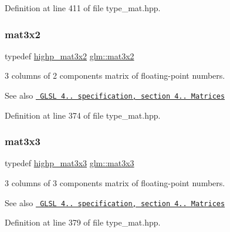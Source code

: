 Definition at line 411 of file type\+\_\+mat.\+hpp.

\mbox{\label{group__core__types_gad7476e0e866186f12ee87975c6b01552}} 
\subsubsection{\texorpdfstring{mat3x2}{mat3x2}}
{\footnotesize\ttfamily typedef \mbox{\hyperlink{group__core__precision_ga5df0f5c4120d0fd47825506c86b7814c}{highp\+\_\+mat3x2}} \mbox{\hyperlink{group__core__types_gad7476e0e866186f12ee87975c6b01552}{glm\+::mat3x2}}}

3 columns of 2 components matrix of floating-\/point numbers.

\begin{DoxySeeAlso}{See also}
\href{http://www.opengl.org/registry/doc/GLSLangSpec.4.20.8.pdf}{\texttt{ G\+L\+SL 4.. specification, section 4.. Matrices}} 
\end{DoxySeeAlso}


Definition at line 374 of file type\+\_\+mat.\+hpp.

\mbox{\label{group__core__types_ga6fecca6a869070b6bf8acb44ce1c2af3}} 
\subsubsection{\texorpdfstring{mat3x3}{mat3x3}}
{\footnotesize\ttfamily typedef \mbox{\hyperlink{group__core__precision_gac4db2c4ff089b960ddd5682abaa9e5d4}{highp\+\_\+mat3x3}} \mbox{\hyperlink{group__core__types_ga6fecca6a869070b6bf8acb44ce1c2af3}{glm\+::mat3x3}}}

3 columns of 3 components matrix of floating-\/point numbers.

\begin{DoxySeeAlso}{See also}
\href{http://www.opengl.org/registry/doc/GLSLangSpec.4.20.8.pdf}{\texttt{ G\+L\+SL 4.. specification, section 4.. Matrices}} 
\end{DoxySeeAlso}


Definition at line 379 of file type\+\_\+mat.\+hpp.

\mbox{\label{group__core__types_ga5524ae15d7fc00a68b8e0e3a0733cc2a}} 
